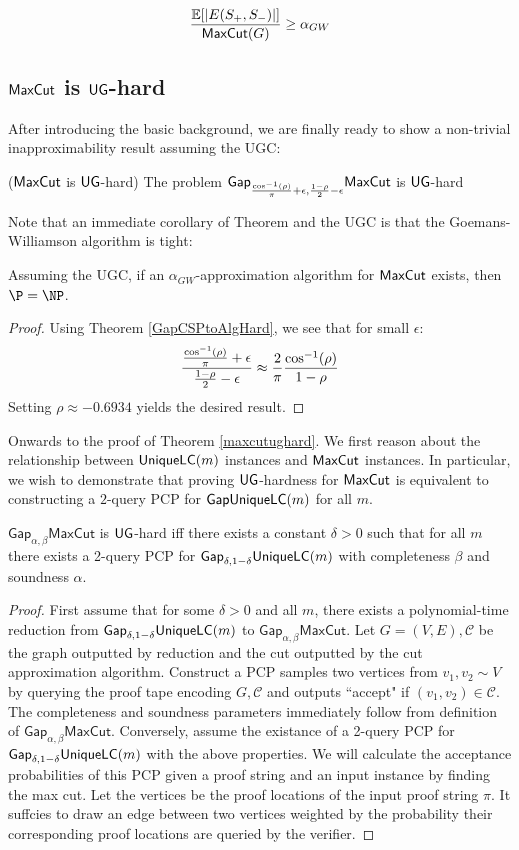 \begin{equation}
  \frac{\mathbb{E}[|E(S_+,S_-)|]}{\mathsf{MaxCut}(G)} \geq \alpha_{GW}
\end{equation}

\subsection{$\mathsf{MaxCut}$ is $\mathsf{UG}$-hard}
After introducing the basic background, we are finally ready to show a non-trivial inapproximability result assuming the UGC:

\begin{theorem} \label{maxcutughard} ($\mathsf{MaxCut}$ is $\mathsf{UG}$-hard) The problem $\mathsf{Gap}_{\frac{\cos^{-1}(\rho)}{\pi} + \epsilon, \frac{1-\rho}{2} - \epsilon}\mathsf{MaxCut}$ is $\mathsf{UG}$-hard
\end{theorem}
Note that an immediate corollary of Theorem and the UGC is that the Goemans-Williamson algorithm is tight:

\begin{corollary}
Assuming the UGC, if an $\alpha_{GW}$-approximation algorithm for $\mathsf{MaxCut}$ exists, then $\P = \NP$.
\end{corollary}
%
\begin{proof}
Using Theorem \ref{GapCSPtoAlgHard}, we see that for small $\epsilon$:
\[ \frac{\frac{\cos^{-1}(\rho)}{\pi} + \epsilon}{\frac{1-\rho}{2} - \epsilon} \approx \frac{2}{\pi}\frac{\cos^{-1}(\rho)}{1 - \rho} \]
Setting $\rho \approx -0.6934$ yields the desired result.
\end{proof}

Onwards to the proof of Theorem \ref{maxcutughard}. We first reason about the relationship between $\mathsf{UniqueLC}(m)$ instances and $\mathsf{MaxCut}$ instances. In particular, we wish to demonstrate that proving $\mathsf{UG}$-hardness for $\mathsf{MaxCut}$ is equivalent to constructing a $2$-query PCP for $\mathsf{GapUniqueLC}(m)$ for all $m$.

\begin{theorem}
  $\mathsf{Gap}_{\alpha,\beta}\mathsf{MaxCut}$ is $\mathsf{UG}$-hard iff there exists a constant $\delta > 0$ such that for all $m$ there exists a 2-query PCP for $\mathsf{Gap}_{\delta, 1-\delta}\mathsf{UniqueLC}(m)$ with completeness $\beta$ and soundness $\alpha$.
\end{theorem}
%
\begin{proof}
  First assume that for some $\delta > 0$ and all $m$, there exists a polynomial-time reduction from $\mathsf{Gap}_{\delta, 1-\delta}\mathsf{UniqueLC}(m)$ to $\mathsf{Gap}_{\alpha,\beta}\mathsf{MaxCut}$. Let $G=(V,E), \mathcal{C}$ be the graph outputted by reduction and the cut outputted by the cut approximation algorithm. Construct a PCP samples two vertices from $v_1, v_2 \sim V$ by querying the proof tape encoding $G,\mathcal{C}$ and outputs ``accept" if $(v_1,v_2) \in \mathcal{C}$. The completeness and soundness parameters immediately follow from definition of $\mathsf{Gap}_{\alpha,\beta}\mathsf{MaxCut}$. Conversely, assume the existance of a 2-query PCP for $\mathsf{Gap}_{\delta, 1-\delta}\mathsf{UniqueLC}(m)$ with the above properties. We will calculate the acceptance probabilities of this PCP given a proof string and an input instance by finding the max cut. Let the vertices be the proof locations of the input proof string $\pi$. It suffcies to draw an edge between two vertices weighted by the probability their corresponding proof locations are queried by the verifier.
\end{proof}

